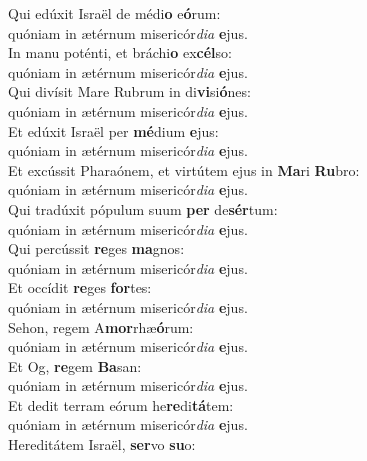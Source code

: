 \evenverse Qui edúxit Israël de médi\textbf{o} e\textbf{ó}rum:~\*\\
\evenverse quóniam in ætérnum misericór\textit{di}\textit{a} \textbf{e}jus.\\
\oddverse In manu poténti, et bráchi\textbf{o} ex\textbf{cél}so:~\*\\
\oddverse quóniam in ætérnum misericór\textit{di}\textit{a} \textbf{e}jus.\\
\evenverse Qui divísit Mare Rubrum in di\textbf{vi}si\textbf{ó}nes:~\*\\
\evenverse quóniam in ætérnum misericór\textit{di}\textit{a} \textbf{e}jus.\\
\oddverse Et edúxit Israël per \textbf{mé}dium \textbf{e}jus:~\*\\
\oddverse quóniam in ætérnum misericór\textit{di}\textit{a} \textbf{e}jus.\\
\evenverse Et excússit Pharaónem, et virtútem ejus in \textbf{Ma}ri \textbf{Ru}bro:~\*\\
\evenverse quóniam in ætérnum misericór\textit{di}\textit{a} \textbf{e}jus.\\
\oddverse Qui tradúxit pópulum suum \textbf{per} de\textbf{sér}tum:~\*\\
\oddverse quóniam in ætérnum misericór\textit{di}\textit{a} \textbf{e}jus.\\
\evenverse Qui percússit \textbf{re}ges \textbf{ma}gnos:~\*\\
\evenverse quóniam in ætérnum misericór\textit{di}\textit{a} \textbf{e}jus.\\
\oddverse Et occídit \textbf{re}ges \textbf{for}tes:~\*\\
\oddverse quóniam in ætérnum misericór\textit{di}\textit{a} \textbf{e}jus.\\
\evenverse Sehon, regem A\textbf{mor}rhæ\textbf{ó}rum:~\*\\
\evenverse quóniam in ætérnum misericór\textit{di}\textit{a} \textbf{e}jus.\\
\oddverse Et Og, \textbf{re}gem \textbf{Ba}san:~\*\\
\oddverse quóniam in ætérnum misericór\textit{di}\textit{a} \textbf{e}jus.\\
\evenverse Et dedit terram eórum he\textbf{re}di\textbf{tá}tem:~\*\\
\evenverse quóniam in ætérnum misericór\textit{di}\textit{a} \textbf{e}jus.\\
\oddverse Hereditátem Israël, \textbf{ser}vo \textbf{su}o:~\*\\
